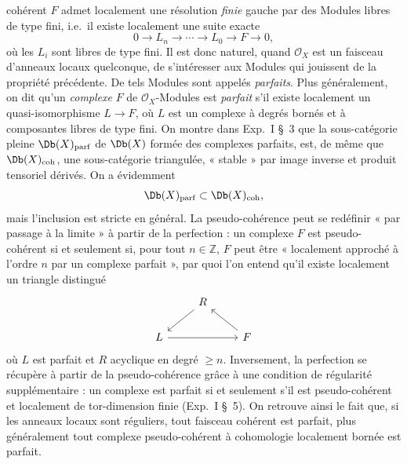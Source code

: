 cohérent \(F\) admet localement une résolution \emph{finie} gauche par des Modules libres de type fini, i.e.\ il existe localement une suite exacte
\[
  0\longrightarrow L_n\longrightarrow \cdots \longrightarrow L_0\longrightarrow F\longrightarrow 0,
\]
où les \(L_i\) sont libres de type fini. Il est donc naturel, quand \(\mathcal O_X\) est un faisceau d'anneaux locaux quelconque, de s'intéresser aux Modules qui jouissent de la propriété précédente. De tels Modules sont appelés \emph{parfaits}. Plus généralement, on dit qu'un \emph{complexe} \(F\) de \(\mathcal O_X\)-Modules est \emph{parfait} s'il existe localement un quasi-isomorphisme \(L\to F\), où \(L\) est un complexe à degrés bornés et à composantes libres de type fini. On montre dans Exp.\ I \S~3 que la sous-catégorie pleine \(\Db(X)_{\mathrm{parf}}\) de \(\Db(X)\) formée des complexes parfaits, est, de même que \(\Db(X)_{\mathrm{coh}}\), une sous-catégorie triangulée, « stable » par image inverse et produit tensoriel dérivés. On a évidemment
\[
  \Db(X)_{\mathrm{parf}}\subset\Db(X)_{\mathrm{coh}},
\]
mais l'inclusion est stricte en général. La pseudo-cohérence peut se redéfinir « par passage à la limite » à partir de la perfection : un complexe \(F\) est pseudo-cohérent si et seulement si, pour tout \(n\in\mathbb Z\), \(F\) peut être « localement approché à l'ordre \(n\) par un complexe parfait », par quoi l'on entend qu'il existe localement un triangle distingué
\[
\begin{tikzcd}
& R \arrow[dl] &\\
L \arrow[rr] && F \arrow[ul]
\end{tikzcd}
\]
où \(L\) est parfait et \(R\) acyclique en degré \(\geq n\). Inversement, la perfection se récupère à partir de la pseudo-cohérence grâce à une condition de régularité supplémentaire : un complexe est parfait si et seulement s'il est pseudo-cohérent et localement de tor-dimension finie (Exp.\ I \S~5). On retrouve ainsi le fait que, si les anneaux locaux sont réguliers, tout faisceau cohérent est parfait, plus généralement tout complexe pseudo-cohérent à cohomologie localement bornée est parfait.

